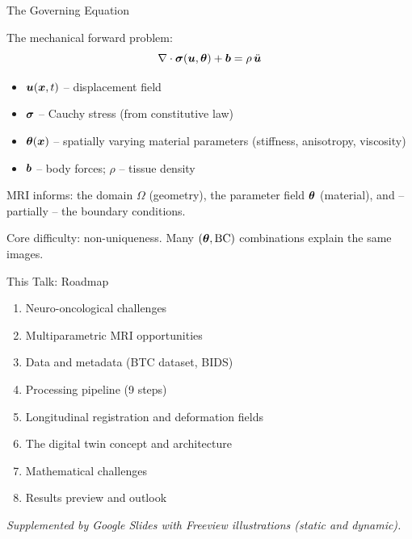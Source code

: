 \begin{frame}{The Governing Equation}

  The mechanical forward problem:
  \[
    \nabla \cdot \bm{\sigma}(\bm{u}, \bm{\theta}) + \bm{b}
    = \rho\,\ddot{\bm{u}}
  \]

  \begin{itemize}
    \item $\bm{u}(\bm{x},t)$ -- displacement field
    \item $\bm{\sigma}$ -- Cauchy stress (from constitutive law)
    \item $\bm{\theta}(\bm{x})$ -- spatially varying material parameters
      (stiffness, anisotropy, viscosity)
    \item $\bm{b}$ -- body forces; $\rho$ -- tissue density
  \end{itemize}

  \bigskip

  MRI informs: the domain $\Omega$ (geometry), the parameter field
  $\bm{\theta}$ (material), and -- partially -- the boundary conditions.

  \bigskip

  \alert{Core difficulty:} non-uniqueness. Many $(\bm{\theta}, \text{BC})$
  combinations explain the same images.

\end{frame}

\begin{frame}{This Talk: Roadmap}

  \begin{enumerate}
    \item Neuro-oncological challenges
    \item Multiparametric MRI opportunities
    \item Data and metadata (BTC dataset, BIDS)
    \item Processing pipeline (9 steps)
    \item Longitudinal registration and deformation fields
    \item The digital twin concept and architecture
    \item Mathematical challenges
    \item Results preview and outlook
  \end{enumerate}

  \bigskip
  \small
  \textit{Supplemented by Google Slides with Freeview illustrations
  (static and dynamic).}

\end{frame}
